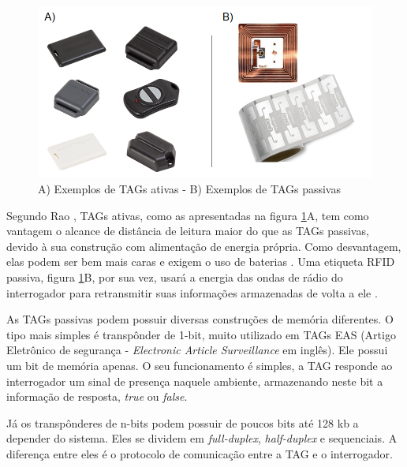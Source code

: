 \begin{figure}[h]
    \centering
    \includegraphics[width=0.8\linewidth]{figs/Fundamentos/tags.png}
    \caption{A) Exemplos de TAGs ativas \cite{wavetrend} - B) Exemplos de TAGs passivas \cite{IDTechEx} \cite{RFIDInsider}}
    \label{fig:tags-fundam}
\end{figure}





Segundo Rao \cite{rao1999overview}, TAGs ativas, como as apresentadas na figura \ref{fig:tags-fundam}A, tem como vantagem o alcance de distância de leitura maior do que as TAGs passivas, devido à sua construção com alimentação de energia própria. Como desvantagem, elas podem ser bem mais caras e exigem o uso de baterias \cite{rao1999overview}. Uma etiqueta RFID passiva, figura \ref{fig:tags-fundam}B, por sua vez, usará a energia das ondas de rádio do interrogador para retransmitir suas informações armazenadas de volta a ele \cite{EPC-RFID-link}.

As TAGs passivas podem possuir diversas construções de memória diferentes. O tipo mais simples é transpônder de 1-bit, muito utilizado em TAGs EAS (Artigo Eletrônico de segurança - \textit{Electronic Article Surveillance} em inglês). Ele possui um bit de memória apenas. O seu funcionamento é simples, a TAG responde ao interrogador um sinal de presença naquele ambiente, armazenando neste bit a informação de resposta, \textit{true} ou \textit{false}. \cite{book:klaus}

Já os transpônderes de n-bits podem possuir de poucos bits até 128 kb a depender do sistema. Eles se dividem em \textit{full-duplex}, \textit{half-duplex} e sequenciais. A diferença entre eles é o protocolo de comunicação entre a TAG e o interrogador. \cite{book:klaus}

